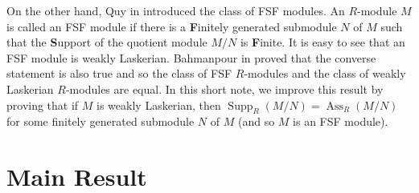 \documentclass{amsart}
\theoremstyle{definition}
\numberwithin{equation}{section}
\newcommand\supp {\operatorname{Supp}}
\newcommand\ass {\operatorname{Ass}}
\begin{document}
On the other hand, Quy in \cite{q} introduced the class of FSF modules. An $R$-module $M$ is called an FSF module if there is a \textbf{F}initely generated submodule $N$ of $M$ such that the \textbf{S}upport of the
quotient module $M/N$ is \textbf{F}inite. It is easy to see that an FSF module is weakly Laskerian. Bahmanpour in \cite{b} proved that the converse statement is also true and so the class of FSF $R$-modules and the class of weakly Laskerian $R$-modules are equal. In this short note, we improve this result by proving  that if $M$ is weakly Laskerian, then $\supp_R(M/N)=\ass_R(M/N)$ for some finitely generated submodule $N$ of $M$ (and so $M$ is an FSF module).

\section{\bf Main Result}
\end{document}
